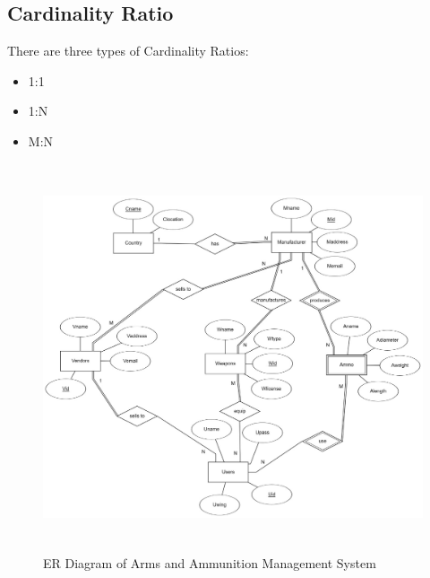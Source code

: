 \documentclass[12pt,a4paper]{report}
\begin{document}
\subsection{Cardinality Ratio}
There are three types of Cardinality Ratios:
\begin{itemize}
\item 1:1
\item 1:N
\item M:N
\end{itemize}
\begin{figure}[hbtp]
\includegraphics[width=6in,height=4.5in]{../fig/entity}
\caption{ER Diagram of Arms and Ammunition Management System}
\end{figure}
\end{document}
